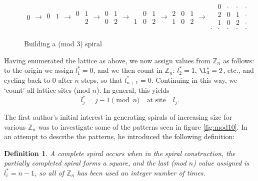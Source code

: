 \documentclass[11pt,reqno]{amsart}
\theoremstyle{mydef}
\newtheorem{definition}{Definition}
\def\ZZ{\mathbb{Z}}
\begin{document}
\begin{figure}[h]
\[  \begin{array}{c}
\boxed{0}
\end{array} 
\rightarrow
%
\begin{array}{cc}
\boxed{0} & 1 \\
\  & \ 
\end{array}
\rightarrow
\begin{array}{cc}
\boxed{0} & 1 \\
\  & 2
\end{array}
\rightarrow
\begin{array}{cc}
\boxed{0} & 1 \\
0 & 2
\end{array}
\rightarrow
\begin{array}{ccc}
\  & \boxed{0} & 1 \\
1 & 0 & 2
\end{array}
\rightarrow
\begin{array}{ccc}
2 & \boxed{0} & 1 \\
1 & 0 & 2
\end{array}
\rightarrow
\begin{array}{ccccc}
\  & 0 & \cdot  & \cdot & \cdot \\
\  & 2 & \boxed{0} & 1 & \cdot \\
\  & 1 & 0 & 2 & \cdot \\
\cdot & \cdot & \cdot & \cdot & \cdot
\end{array}
\]
\caption{Building a (mod 3) spiral}
\label{fig:mod3spiral}
\end{figure}

Having enumerated the lattice as above, we now assign values from
$\ZZ_n$ as follows: to the origin we assign $l_1^* = 0$, and we then
count in $\ZZ_n$: $l_2^* = 1$, $\l_3^* = 2$, etc., and cycling back to
$0$ after $n$ steps, so that $l_{n+1}^* = 0$.  Continuing in this way,
we `count' all lattice sites (mod $n$).  In general, this yields
\[
  l_j^* = j-1 \!\!\!\pmod n \quad\text{at site}\quad l_j.
\]




The first author's initial interest in generating spirals of
increasing size for various $\ZZ_n$ was to investigate some of the
patterns seen in figure \ref{fig:mod10}.  In an attempt to describe
the patterns, he introduced the following definition:



\begin{definition}%
  A \emph{complete spiral} occurs when in the spiral construction, the
  partially completed spiral forms a square, and the last (mod $n$)
  value assigned is $l^*_i = n-1$, so all of $\ZZ_n$ has been used an
  integer number of times.
\end{definition}
\end{document}
